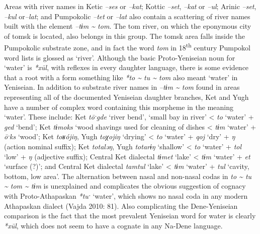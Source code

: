 Areas with river names in Ketic \textit{–ses }or\textit{ –kat}; Kottic \textit{–set}, \textit{–kat }or\textit{ –ul}; Arinic \textit{–set}, \textit{–kul }or\textit{–lat}; and Pumpokolic \textit{–tet} or\textit{ –lat} also contain a scattering of river names built with the element \textit{–tɨm \~{} tom}. The tom river, on which the eponymous city of tomsk is located, also belongs in this group. The tomsk area falls inside the Pumpokolic substrate zone, and in fact the word \textit{tom} in 18\textsuperscript{th} century Pumpokol word lists is glossed as ‘river’. Although the basic Proto-Yeniseian noun for ‘water’ is \textit{*x\=ul}, with reflexes in every daughter language, there is some evidence that a root with a form something like \textit{*to \~{} tu \~{} tom }also meant ‘water’ in Yeniseian. In addition to substrate river names in \textit{–tɨm \~{} tom} found in areas representing all of the documented Yeniseian daughter branches, Ket and Yugh have a number of complex word containing this morpheme in the meaning ‘water’. These include: Ket \textit{t\={o}ˑgde} ‘river bend’, ‘small bay in river’ {\textless}\textit{ to }‘water’ + \textit{ged }‘bend’; Ket \textit{tɨmoks}\textbf{\textit{ }}‘wood shavings used for cleaning of dishes {\textless}\textbf{\textit{ }}\textit{tɨm }‘water’ + \textit{\={o}ˑks }‘wood’; Ket \textit{toʁ\'{o}jiŋ}, Yugh \textit{toχojiŋ }‘drying’ {\textless} \textit{to }‘water’ + \textit{qoj }‘dry’ + \textit{ŋ }(action nominal suffix); Ket \textit{totaləŋ}, Yugh \textit{totarɨŋ }‘shallow’ {\textless} \textit{to} ‘water’ + \textit{tol} ‘low’ + \textit{ŋ} (adjective suffix); Central Ket dialectal \textit{tɨmet} ‘lake’ {\textless} \textit{tɨm} ‘water’ + \textit{et }‘surface (?)’; and Central Ket dialectal \textit{tamtul} ‘lake’ {\textless} \textit{tɨm} ‘water’ + \textit{tul} ‘cavity, bottom, low area’. The alternation between nasal and non-nasal codas in \textit{to \~{} tu \~{} tom \~{} tɨm }is unexplained and complicates the obvious suggestion of cognacy with Proto-Athapaskan \textit{*tuˑ} ‘water’, which shows no nasal coda in any modern Athapaskan dialect (Vajda 2010: 81). Also complicating the Dene-Yeniseian comparison is the fact that the most prevalent Yeniseian word for water is clearly \textit{*x\=ul}, which does not seem to have a cognate in any Na-Dene language.

